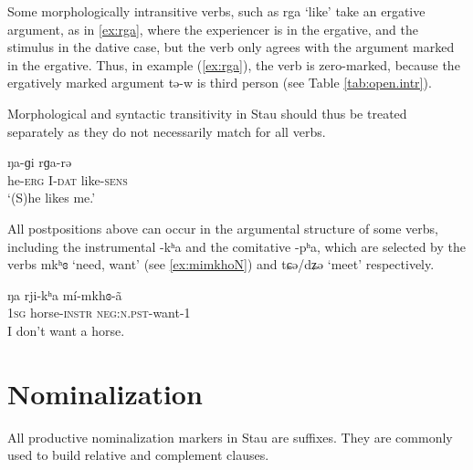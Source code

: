 \documentclass[oneside,a4paper,11pt]{article}
\newcommand{\ipa}[1]{{\phon #1}} %
\begin{document}
Some morphologically intransitive verbs, such as \ipa{rga} `like' take an ergative argument, as in \ref{ex:rga}, where the experiencer is in the ergative, and the stimulus in the dative case, but the verb only agrees with the argument marked in the ergative. Thus, in example (\ref{ex:rga}), the verb is zero-marked, because the ergatively marked argument \ipa{tə-w} is third person (see Table \ref{tab:open.intr}).

 Morphological and syntactic transitivity in Stau should thus be treated separately as they do not necessarily match for all verbs.

 \begin{exe}
\ex \label{ex:rga}
\gll \ipa{tə-w}  	\ipa{ŋa-ɡi}  	\ipa{rɡa-rə}  
 \\
he-\textsc{erg} I-\textsc{dat} like-\textsc{sens} \\
\glt `(S)he likes me.'
\end{exe}

All postpositions above can occur in the argumental structure of some verbs, including the instrumental \ipa{-kʰa} and the comitative \ipa{-pʰa}, which are selected by the verbs \ipa{mkʰɞ} `need, want' (see \ref{ex:mimkhoN}) and \ipa{tɕə/dʑə} `meet' respectively.

 \begin{exe}
\ex \label{ex:mimkhoN}
\gll
\ipa{ŋa} 	\ipa{rji-kʰa} 	\ipa{mí-mkhɞ-ã} \\
\textsc{1sg} horse-\textsc{instr} \textsc{neg:n.pst}-want-1 \\
\glt I don't want a horse.
\end{exe}

%	


 


%
%
%
%
%
%

%


\section{Nominalization} \label{sec:nmlz}
All productive nominalization markers in Stau are suffixes. They are commonly used to build relative and complement clauses.
\end{document}
